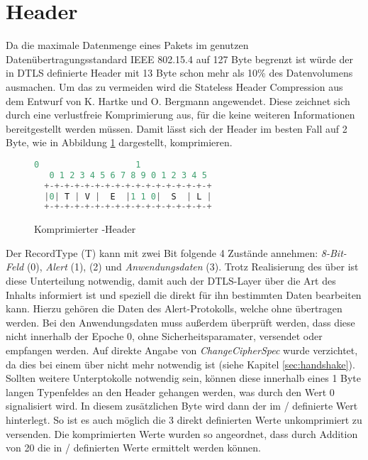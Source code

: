 \section{Header}
\label{sec:headercompression}

Da die maximale Datenmenge eines Pakets im genutzen Datenübertragungsstandard IEEE 802.15.4 \cite{ieee802154} auf 127 Byte begrenzt ist würde der in DTLS
definierte Header mit 13 Byte schon mehr als 10\% des Datenvolumens ausmachen. Um das zu vermeiden wird die Stateless Header Compression aus dem Entwurf
von K. Hartke und O. Bergmann \cite[Kapitel 3]{draftcodtls} angewendet. Diese zeichnet sich durch eine verlustfreie Komprimierung aus, für die keine weiteren
Informationen bereitgestellt werden müssen. Damit lässt sich der Header im besten Fall auf 2 Byte, wie in Abbildung \ref{fig:com_handshake_header} dargestellt,
komprimieren.

\begin{figure}[ht]
  \centering
  \begin{lstlisting}[language=c]
   0                   1
   0 1 2 3 4 5 6 7 8 9 0 1 2 3 4 5
  +-+-+-+-+-+-+-+-+-+-+-+-+-+-+-+-+
  |0| T | V |  E  |1 1 0|  S  | L |
  +-+-+-+-+-+-+-+-+-+-+-+-+-+-+-+-+
  \end{lstlisting}
  \caption{Komprimierter -Header}
  \label{fig:com_handshake_header}
\end{figure}

Der RecordType (T) kann mit zwei Bit folgende 4 Zustände annehmen: \textit{8-Bit-Feld} (0), \textit{Alert} (1), \textit{} (2) und
\textit{Anwendungsdaten} (3). Trotz Realisierung des  über  ist diese Unterteilung notwendig, damit auch der DTLS-Layer über die
Art des Inhalts informiert ist und speziell die direkt für ihn bestimmten Daten bearbeiten kann. Hierzu gehören die Daten des Alert-Protokolls,
welche ohne  übertragen werden. Bei den Anwendungsdaten muss außerdem überprüft werden, dass diese nicht innerhalb der Epoche 0, ohne
Sicherheitsparamater, versendet oder empfangen werden. Auf direkte Angabe von \textit{ChangeCipherSpec} wurde verzichtet, da dies bei einem
 über  nicht mehr notwendig ist (siehe Kapitel \ref{sec:handshake}). Sollten  weitere Unterptokolle notwendig sein, können
diese innerhalb eines 1 Byte langen Typenfeldes an den Header gehangen werden, was durch den Wert 0 signalisiert wird. In diesem zusätzlichen
Byte wird dann der im / definierte Wert hinterlegt. So ist es auch möglich die 3 direkt definierten Werte unkomprimiert zu
versenden. Die komprimierten Werte wurden so angeordnet, dass durch Addition von 20 die in / definierten Werte ermittelt werden können.

